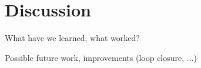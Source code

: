 \section{Discussion}
What have we learned, what worked?

Possible future work, improvements (loop closure, ...)
